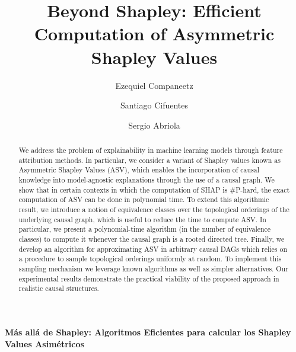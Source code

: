 \documentclass{llncs}
\begin{document}
\title{Beyond Shapley: Efficient Computation of Asymmetric Shapley Values}

\author{
	Ezequiel Companeetz
	\and
	Santiago Cifuentes
	\and
	Sergio Abriola
}


\maketitle              %
%
\begin{abstract}
We address the problem of explainability in machine learning models through feature attribution methods. In particular, we consider a variant of Shapley values known as Asymmetric Shapley Values (ASV), which enables the incorporation of causal knowledge into model-agnostic explanations through the use of a causal graph. We show that in certain contexts in which the computation of SHAP is \#\textsc{P}-hard, the exact computation of ASV can be done in polynomial time.
To extend this algorithmic result, we introduce a notion of equivalence classes over the topological orderings of the underlying causal graph, which is useful to reduce the time to compute ASV. In particular, we present a polynomial-time algorithm (in the number of equivalence classes) to compute it whenever the causal graph is a rooted directed tree.
Finally, we develop an algorithm for approximating ASV in arbitrary causal DAGs which relies on a procedure to sample topological orderings uniformly at random. To implement this sampling mechanism we leverage known algorithms as well as simpler alternatives. Our experimental results demonstrate the practical viability of the proposed approach in realistic causal structures.

\end{abstract}


\begin{center}
\vspace{1cm}
{\Large \bfseries\boldmath Más allá de Shapley: Algoritmos Eficientes para calcular los Shapley Values Asimétricos}

\vspace{0.5cm}
\end{center}
\end{document}
